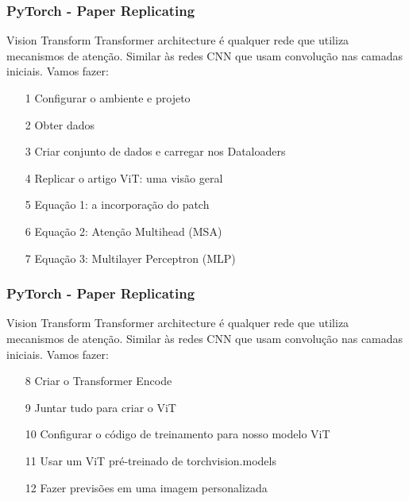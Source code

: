 \documentclass{beamer}
\begin{document}
\begin{frame}
	\frametitle{PyTorch - Paper Replicating}
	\begin{block}{Vision Transform}
		Transformer architecture é qualquer rede que utiliza mecanismos de atenção. Similar às redes CNN que usam convolução nas camadas iniciais. Vamos fazer:
		\begin{itemize}
			\item[1] Configurar o ambiente e projeto
			\item[2] Obter dados
			\item[3] Criar conjunto de dados e carregar nos Dataloaders
			\item[4] Replicar o artigo ViT: uma visão geral
			\item[5] Equação 1: a incorporação do patch
			\item[6] Equação 2: Atenção Multihead (MSA)
			\item[7] Equação 3: Multilayer Perceptron (MLP)
		\end{itemize}
	\end{block}
\end{frame} 
\begin{frame}
	\frametitle{PyTorch - Paper Replicating}
	\begin{block}{Vision Transform}
		Transformer architecture é qualquer rede que utiliza mecanismos de atenção. Similar às redes CNN que usam convolução nas camadas iniciais. Vamos fazer:
		\begin{itemize}
			\item[8] Criar o Transformer Encode
			\item[9] Juntar tudo para criar o ViT
			\item[10] Configurar o código de treinamento para nosso modelo ViT
			\item[11] Usar um ViT pré-treinado de torchvision.models
			\item[12] Fazer previsões em uma imagem personalizada
		\end{itemize}
	\end{block}
\end{frame} 
\end{document}
